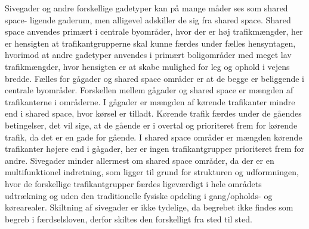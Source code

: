 Sivegader og andre forskellige gadetyper kan på mange måder ses som shared space- ligende gaderum, men alligevel adskiller de sig fra shared space. Shared space anvendes primært i centrale byområder, hvor der er høj trafikmængder, her er hensigten at trafikantgrupperne skal kunne færdes under fælles hensyntagen, hvorimod at andre gadetyper anvendes i primært boligområder med meget lav trafikmængder, hvor hensigten er at skabe mulighed for leg og ophold i vejens bredde.
Fælles for gågader og shared space områder er at de begge er beliggende i centrale byområder. Forskellen mellem gågader og shared space er mængden af trafikanterne i områderne. I gågader er mængden af kørende trafikanter mindre end i shared space, hvor kørsel er tilladt. Kørende trafik færdes under de gåendes betingelser, det vil sige, at de gående er i overtal og prioriteret frem for kørende trafik, da det er en gade for gående. I shared space områder er mængden kørende trafikanter højere end i gågader, her er ingen trafikantgrupper prioriteret frem for andre.
Sivegader minder allermest om shared space områder, da der er en multifunktionel indretning, som ligger til grund for strukturen og udformningen, hvor de forskellige trafikantgrupper færdes ligeværdigt i hele områdets udtrækning og uden den traditionelle fysiske opdeling i gang/opholds- og kørearealer. Skiltning af sivegader er ikke tydelige, da begrebet ikke findes som begreb i færdselsloven, derfor skiltes den forskelligt fra sted til sted.\autocite{vejlednigomss2013}
